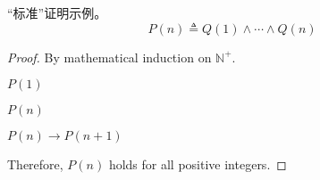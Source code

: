 \begin{frame}{}
\end{frame}


% 
% 

\begin{frame}{}
  \begin{exampleblock}{``标准''证明示例。}
    \[
      P(n) \triangleq Q(1) \land \cdots \land Q(n)
    \]

  \end{exampleblock}

  \vspace{0.60cm}
  \pause
  \begin{proof}
    By mathematical induction on $\mathbb{N}^{+}$.

    \begin{description}
      \item[Basis Step] $P(1)$
      \item<3->[\textcolor{cyan}{Inductive Hypothesis}] $P(n)$
      \item[Inductive Step] $P(n) \to P(n+1)$
    \end{description}

    Therefore, $P(n)$ holds for all positive integers.
  \end{proof}
\end{frame}

